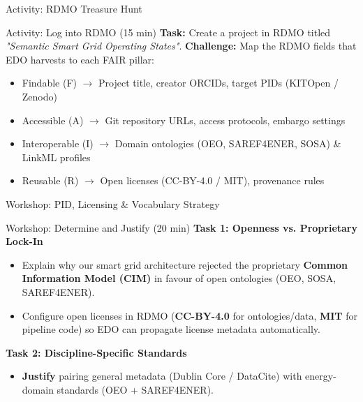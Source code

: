 \documentclass[aspectratio=169]{beamer}
\let\pause\relax
\begin{document}
\begin{frame}{Activity: RDMO Treasure Hunt}
    \begin{block}{Activity: Log into RDMO (15 min)}
        \textbf{Task:} Create a project in RDMO titled \emph{"Semantic Smart Grid Operating States"}.
        \pause
        \textbf{Challenge:} Map the RDMO fields that EDO harvests to each FAIR pillar:
        \begin{itemize}
            \item Findable (F) $\rightarrow$ Project title, creator ORCIDs, target PIDs (KITOpen / Zenodo)
            \item Accessible (A) $\rightarrow$ Git repository URLs, access protocols, embargo settings
            \item Interoperable (I) $\rightarrow$ Domain ontologies (OEO, SAREF4ENER, SOSA) \& LinkML profiles
            \item Reusable (R) $\rightarrow$ Open licenses (CC-BY-4.0 / MIT), provenance rules
        \end{itemize}
    \end{block}
\end{frame}

\begin{frame}{Workshop: PID, Licensing \& Vocabulary Strategy}
    \begin{block}{Workshop: Determine and Justify (20 min)}
        \textbf{Task 1: Openness vs. Proprietary Lock-In}
        \begin{itemize}
            \item Explain why our smart grid architecture rejected the proprietary \textbf{Common Information Model (CIM)} in favour of open ontologies (OEO, SOSA, SAREF4ENER).
            \item Configure open licenses in RDMO (\textbf{CC-BY-4.0} for ontologies/data, \textbf{MIT} for pipeline code) so EDO can propagate license metadata automatically.
        \end{itemize}
        \pause
        \textbf{Task 2: Discipline-Specific Standards}
        \begin{itemize}
            \item \textbf{Justify} pairing general metadata (Dublin Core / DataCite) with energy-domain standards (OEO + SAREF4ENER).
        \end{itemize}
    \end{block}
\end{frame}

\end{document}
